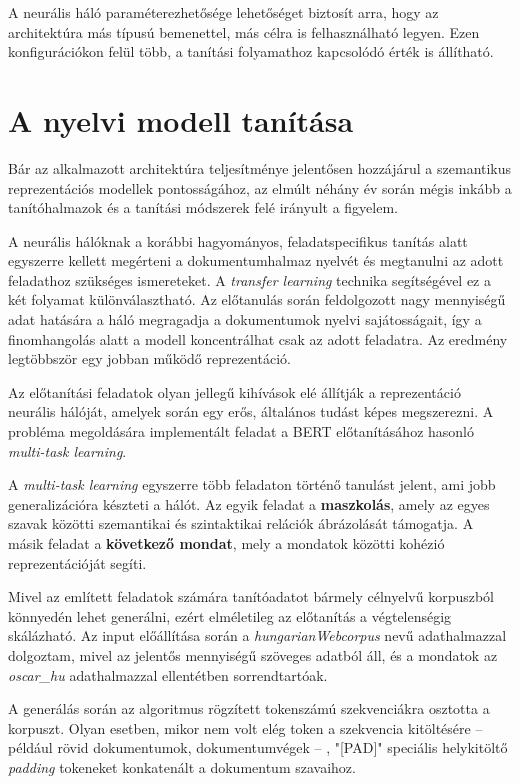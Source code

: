 A neurális háló paraméterezhetősége lehetőséget biztosít arra, hogy az architektúra más típusú bemenettel, más célra is felhasználható legyen. Ezen konfigurációkon felül több, a tanítási folyamathoz kapcsolódó érték is állítható.

\section{A nyelvi modell tanítása}

Bár az alkalmazott architektúra teljesítménye jelentősen hozzájárul a szemantikus reprezentációs modellek pontosságához, az elmúlt néhány év során mégis inkább a tanítóhalmazok és a tanítási módszerek felé irányult a figyelem.

A neurális hálóknak a korábbi hagyományos, feladatspecifikus tanítás alatt egyszerre kellett megérteni a dokumentumhalmaz nyelvét és megtanulni az adott feladathoz szükséges ismereteket. A \textit{transfer learning} technika segítségével ez a két folyamat különválasztható. Az előtanulás során feldolgozott nagy mennyiségű adat hatására a háló megragadja a dokumentumok nyelvi sajátosságait, így a finomhangolás alatt a modell koncentrálhat csak az adott feladatra. Az eredmény legtöbbször egy jobban működő reprezentáció.

Az előtanítási feladatok olyan jellegű kihívások elé állítják a reprezentáció neurális hálóját, amelyek során egy erős, általános tudást képes megszerezni. A probléma megoldására implementált feladat a BERT előtanításához hasonló \textit{multi-task learning}. 

A \textit{multi-task learning} egyszerre több feladaton történő tanulást jelent, ami jobb generalizációra készteti a hálót. Az egyik feladat a \textbf{maszkolás}, amely az egyes szavak közötti szemantikai és szintaktikai relációk ábrázolását támogatja. A másik feladat a \textbf{következő mondat}, mely a mondatok közötti kohézió reprezentációját segíti.

Mivel az említett feladatok számára tanítóadatot bármely célnyelvű korpuszból könnyedén lehet generálni, ezért elméletileg az előtanítás a végtelenségig skálázható. Az input előállítása során a \textit{hungarianWebcorpus} nevű adathalmazzal dolgoztam, mivel az jelentős mennyiségű szöveges adatból áll, és a mondatok az \textit{oscar\_hu} adathalmazzal ellentétben sorrendtartóak.

A generálás során az algoritmus rögzített tokenszámú szekvenciákra osztotta a korpuszt. Olyan esetben, mikor nem volt elég token a szekvencia kitöltésére – például rövid dokumentumok, dokumentumvégek – , "[PAD]" speciális helykitöltő \textit{padding} tokeneket konkatenált a dokumentum szavaihoz. 
 
